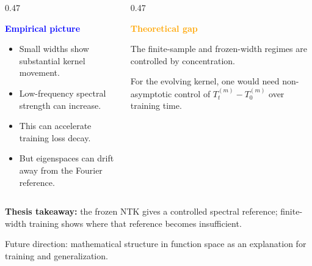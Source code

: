 \documentclass[aspectratio=169,9pt]{beamer}
\begin{document}
\begin{frame}
	\vspace{3mm}
	\pause
	\begin{columns}[T,onlytextwidth]
		\begin{column}{0.47\textwidth}
			\begin{bluecard}[height=25mm]
				{\textcolor{blue}{\bfseries Empirical picture}}\par\vspace{0.8mm}
				\begin{itemize}\scriptsize
					\item Small widths show substantial kernel movement.
					\item Low-frequency spectral strength can increase.
					\item This can accelerate training loss decay.
					\item But eigenspaces can drift away from the Fourier reference.
				\end{itemize}
			\end{bluecard}
		\end{column}
		\begin{column}{0.47\textwidth}
			\begin{orangecard}[height=25mm]
				{\textcolor{orange}{\bfseries Theoretical gap}}\par\vspace{0.8mm}
				{\scriptsize The finite-sample and frozen-width regimes are controlled by concentration.}\par\vspace{1.5mm}
				{\scriptsize For the evolving kernel, one would need non-asymptotic control of $T_t^{(m)}-T_0^{(m)}$ over training time.}
			\end{orangecard}
		\end{column}
	\end{columns}

	\vspace{2.5mm}
	\begin{whitecard}
		\centering
		{\scriptsize\bfseries Thesis takeaway:}
		{\scriptsize the frozen NTK gives a controlled spectral reference; finite-width training shows where that reference becomes insufficient.}
	\end{whitecard}

	\vspace{1mm}
	\centering
	{\scriptsize Future direction: mathematical structure in function space as an explanation for training and generalization.}
\end{frame}
\end{document}

